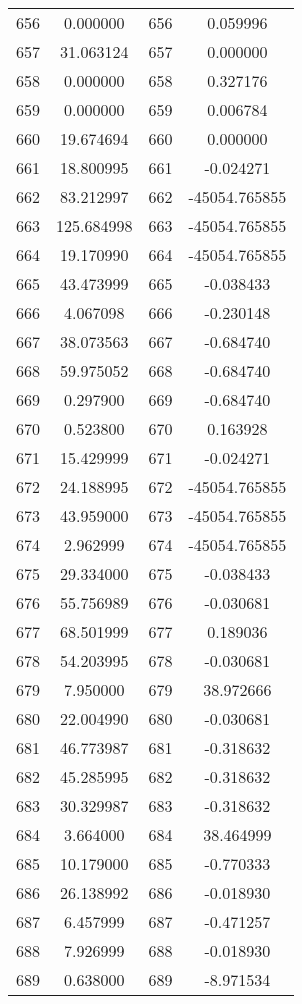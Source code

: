 \documentclass[12pt]{article}
\begin{document}
\begin{longtable}{@{}cccc@{}}
656 & 0.000000 & 656 & 0.059996 \\
657 & 31.063124 & 657 & 0.000000 \\
658 & 0.000000 & 658 & 0.327176 \\
659 & 0.000000 & 659 & 0.006784 \\
660 & 19.674694 & 660 & 0.000000 \\
661 & 18.800995 & 661 & -0.024271 \\
662 & 83.212997 & 662 & -45054.765855 \\
663 & 125.684998 & 663 & -45054.765855 \\
664 & 19.170990 & 664 & -45054.765855 \\
665 & 43.473999 & 665 & -0.038433 \\
666 & 4.067098 & 666 & -0.230148 \\
667 & 38.073563 & 667 & -0.684740 \\
668 & 59.975052 & 668 & -0.684740 \\
669 & 0.297900 & 669 & -0.684740 \\
670 & 0.523800 & 670 & 0.163928 \\
671 & 15.429999 & 671 & -0.024271 \\
672 & 24.188995 & 672 & -45054.765855 \\
673 & 43.959000 & 673 & -45054.765855 \\
674 & 2.962999 & 674 & -45054.765855 \\
675 & 29.334000 & 675 & -0.038433 \\
676 & 55.756989 & 676 & -0.030681 \\
677 & 68.501999 & 677 & 0.189036 \\
678 & 54.203995 & 678 & -0.030681 \\
679 & 7.950000 & 679 & 38.972666 \\
680 & 22.004990 & 680 & -0.030681 \\
681 & 46.773987 & 681 & -0.318632 \\
682 & 45.285995 & 682 & -0.318632 \\
683 & 30.329987 & 683 & -0.318632 \\
684 & 3.664000 & 684 & 38.464999 \\
685 & 10.179000 & 685 & -0.770333 \\
686 & 26.138992 & 686 & -0.018930 \\
687 & 6.457999 & 687 & -0.471257 \\
688 & 7.926999 & 688 & -0.018930 \\
689 & 0.638000 & 689 & -8.971534 \\

\end{longtable}
\end{document}
